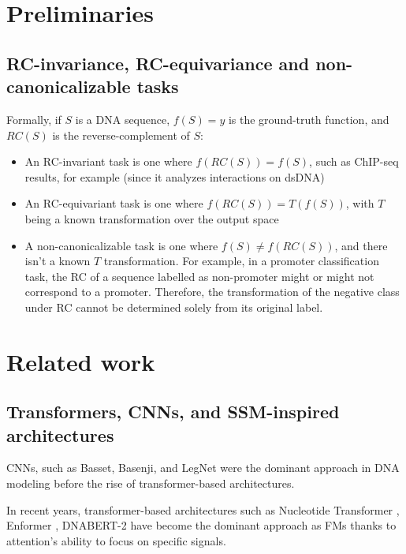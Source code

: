 \documentclass[   ]{article}
\begin{document}
\section{Preliminaries}
\subsection{RC-invariance, RC-equivariance and non-canonicalizable tasks}

Formally, if \(S\) is a DNA sequence, \(f(S)=y\) is the ground-truth
function, and \(RC(S)\) is the reverse-complement of \(S\):
\begin{itemize}
	\item An RC-invariant task is one where \(f(RC(S))=f(S)\), such as ChIP-seq results, for example (since it analyzes interactions on dsDNA)
	\item An RC-equivariant task is one where \(f(RC(S))=T(f(S))\), with \(T\) being
	a known transformation over the output space
	\item A non-canonicalizable task is one where $f(S)\neq f(RC(S))$, and there isn't a known $T$ transformation. For example, in a promoter classification task, the RC of a sequence labelled as
	non-promoter might or might not correspond to a promoter. Therefore, the
	transformation of the negative class under RC cannot be determined
	solely from its original label.
\end{itemize}

\section{Related work} 

\subsection{Transformers, CNNs, and SSM-inspired architectures}
\label{sec:related_work_transformers_and_ssm}

CNNs, such as Basset\citep{kelleyBassetLearningRegulatory2016}, Basenji\citep{kelleySequentialRegulatoryActivity2018}, and LegNet\citep{penzarLegNetBestinclassDeep2023} were the dominant approach in DNA modeling before the rise of transformer-based architectures.

In recent years, transformer-based architectures such as
Nucleotide Transformer
\citep{dalla-torreNucleotideTransformerBuilding2025}, Enformer
\citep{avsecEffectiveGeneExpression2021}, DNABERT-2
\citep{zhouDNABERT2EfficientFoundation2024} have become the
dominant approach as FMs thanks to attention's ability to focus on
specific signals.
\end{document}
